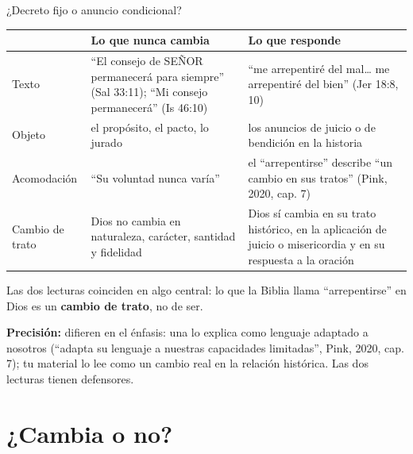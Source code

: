 \documentclass[hyperref={bookmarks=false},aspectratio=169]{beamer}
\newcommand{\SENOR}{S{\fontsize{0.78em}{1em}\selectfont EÑOR}}
\newcommand{\destacar}[1]{\textbf{\textcolor{azul}{#1}}}
\newcommand{\precision}[1]{{\footnotesize\color{gris}\textbf{Precisión:} #1}}
\begin{document}
\begin{frame}{¿Decreto fijo o anuncio condicional?}
\scriptsize\renewcommand{\arraystretch}{1.2}
\begin{tabular}{@{}>{\RaggedRight\arraybackslash}p{2.3cm}>{\RaggedRight\arraybackslash}p{4.7cm}>{\RaggedRight\arraybackslash}p{4.8cm}@{}}
\toprule
 & \textbf{Lo que nunca cambia} & \textbf{Lo que responde} \\ \midrule
Texto & ``El consejo de \SENOR{} permanecerá para siempre'' (Sal 33:11); ``Mi consejo permanecerá'' (Is 46:10) & ``me arrepentiré del mal\ldots{} me arrepentiré del bien'' (Jer 18:8, 10) \\
Objeto & el propósito, el pacto, lo jurado & los anuncios de juicio o de bendición en la historia \\
Acomodación & ``Su voluntad nunca varía'' & el ``arrepentirse'' describe ``un cambio en sus tratos'' (Pink, 2020, cap. 7) \\
Cambio de trato & Dios no cambia en naturaleza, carácter, santidad y fidelidad & Dios sí cambia en su trato histórico, en la aplicación de juicio o misericordia y en su respuesta a la oración \\
\bottomrule
\end{tabular}\par\medskip
\small\RaggedRight Las dos lecturas coinciden en algo central: lo que la Biblia llama ``arrepentirse'' en Dios es un \destacar{cambio de trato}, no de ser.\par\smallskip
\precision{difieren en el énfasis: una lo explica como lenguaje adaptado a nosotros (``adapta su lenguaje a nuestras capacidades limitadas'', Pink, 2020, cap. 7); tu material lo lee como un cambio real en la relación histórica. Las dos lecturas tienen defensores.}
\end{frame}

\section{¿Cambia o no?}
\end{document}

